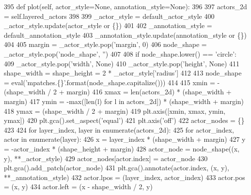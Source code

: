\begin{DoxyCode}
395         \textcolor{keyword}{def }plot(self, actor\_style=None, annotation\_style=None):
396 
397             actors\_2d = self.layered\_actors
398 
399             \_actor\_style = default\_actor\_style
400             \_actor\_style.update(actor\_style \textcolor{keywordflow}{or} \{\})
401 
402             \_annotation\_style = default\_annotation\_style
403             \_annotation\_style.update(annotation\_style \textcolor{keywordflow}{or} \{\})
404 
405             margin = \_actor\_style.pop(\textcolor{stringliteral}{'margin'}, 0)
406             node\_shape = \_actor\_style.pop(\textcolor{stringliteral}{'node\_shape'}, \textcolor{stringliteral}{''})
407 
408             \textcolor{keywordflow}{if} node\_shape.lower() == \textcolor{stringliteral}{'circle'}:
409                 \_actor\_style.pop(\textcolor{stringliteral}{'width'}, \textcolor{keywordtype}{None})
410                 \_actor\_style.pop(\textcolor{stringliteral}{'height'}, \textcolor{keywordtype}{None})
411                 shape\_width = shape\_height = 2 * \_actor\_style[\textcolor{stringliteral}{'radius'}]
412 
413             node\_shape = eval(\textcolor{stringliteral}{'mpatches.\{\}'}.format(node\_shape.capitalize()))
414 
415             xmin = -(shape\_width / 2 + margin)
416             xmax = len(actors\_2d) * (shape\_width + margin)
417             ymin = -max([len(l) \textcolor{keywordflow}{for} l \textcolor{keywordflow}{in} actors\_2d]) * (shape\_width + margin)
418             ymax = (shape\_width / 2 + margin)
419             plt.axis([xmin, xmax, ymin, ymax])
420             plt.gca().set\_aspect(\textcolor{stringliteral}{'equal'})
421             plt.axis(\textcolor{stringliteral}{'off'})
422             actor\_nodes = \{\}
423 
424             \textcolor{keywordflow}{for} layer\_index, layer \textcolor{keywordflow}{in} enumerate(actors\_2d):
425                 \textcolor{keywordflow}{for} actor\_index, actor \textcolor{keywordflow}{in} enumerate(layer):
426                     x = layer\_index * (shape\_width + margin)
427                     y = -actor\_index * (shape\_height + margin)
428                     actor\_node = node\_shape((x, y), **\_actor\_style)
429                     actor\_nodes[actor.index] = actor\_node
430                     plt.gca().add\_patch(actor\_node)
431                     plt.gca().annotate(actor.index, (x, y), **\_annotation\_style)
432                     actor.lpos = (layer\_index, actor\_index)
433                     actor.pos = (x, y)
434                     actor.left = (x - shape\_width / 2, y)

\end{DoxyCode}
